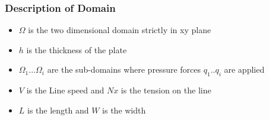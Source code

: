 \documentclass[9pt]{beamer}
\begin{document}

\begin{frame}
\frametitle{Description of Domain}

\begin{figure}[h!]
\centering

\end{figure}
\begin{itemize}

\item $\Omega$ is the two dimensional domain strictly in xy plane 
\item $h$ is the thickness of the plate 
\item $\Omega_1$...$\Omega_i$ are the sub-domains where pressure forces $q_1$..$q_i$ are applied
\item $V$ is the Line speed and  $Nx$ is the tension on the line
\item $L$ is the length and  $W$ is the width 

\end{itemize}

\end{frame}
\end{document}
